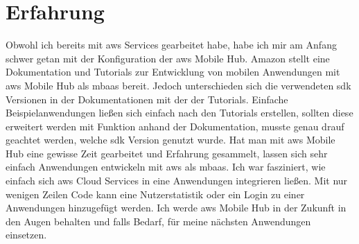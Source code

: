 \section{Erfahrung}
Obwohl ich bereits mit \gls{aws} Services gearbeitet habe, habe ich mir am Anfang schwer getan mit der Konfiguration der \gls{aws} Mobile Hub. Amazon stellt eine Dokumentation und Tutorials zur Entwicklung von mobilen Anwendungen mit \gls{aws} Mobile Hub als \gls{mbaas} bereit. Jedoch unterschieden sich die verwendeten \gls{sdk} Versionen in der Dokumentationen mit der der Tutorials. Einfache Beispielanwendungen ließen sich einfach nach den Tutorials erstellen, sollten diese erweitert werden mit Funktion anhand der Dokumentation, musste genau drauf geachtet werden, welche \gls{sdk} Version genutzt wurde. Hat man mit \gls{aws} Mobile Hub eine gewisse Zeit gearbeitet und Erfahrung gesammelt, lassen sich sehr einfach Anwendungen entwickeln mit \gls{aws} als \gls{mbaas}. Ich war fasziniert, wie einfach sich \gls{aws} Cloud Services in eine Anwendungen integrieren ließen. Mit nur wenigen Zeilen Code kann eine Nutzerstatistik oder ein Login zu einer Anwendungen hinzugefügt werden. Ich werde \gls{aws} Mobile Hub in der Zukunft in den Augen behalten und falls Bedarf, für meine nächsten Anwendungen einsetzen.